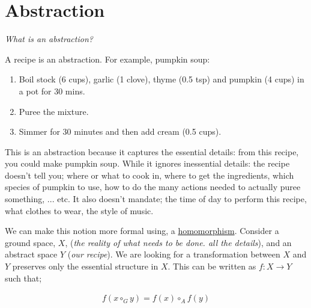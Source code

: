 \chapter{Abstraction}\label{C:abstraction}


\begin{displayquote}
 \textit{What is an abstraction?}
\end{displayquote}

A recipe is an abstraction. For example, pumpkin soup:

\begin{enumerate}
\tightlist
\item Boil stock (6 cups), garlic (1 clove), thyme (0.5 tsp) and pumpkin (4 cups) in a pot for 30 mins.
\item Puree the mixture.
\item Simmer for 30 minutes and then add cream (0.5 cups).
\end{enumerate}

This is an abstraction because it captures the essential details: from this recipe, you could make pumpkin soup.
While it ignores inessential details: the recipe doesn't tell you; where or what to cook in, where to get the
ingredients, which species of pumpkin to use, how to do the many actions needed to actually puree something, ... etc.
It also doesn't mandate; the time of day to perform this recipe, what clothes to wear,
the style of music.


\vspace{5mm}

We can make this notion more formal using, a \href{https://en.wikipedia.org/wiki/Homomorphism}{homomorphism}.
Consider a ground space, $X$, (\textit{the reality of what
needs to be done. all the details}), and an abstract space $Y$ (\textit{our recipe}).
We are looking for a transformation between $X$ and $Y$ preserves only the essential
structure in $X$. This can be written as $f: X\to Y$ such that;


\begin{align*}
f(x \circ_G y) = f(x) \circ_A f(y)
\end{align*}

